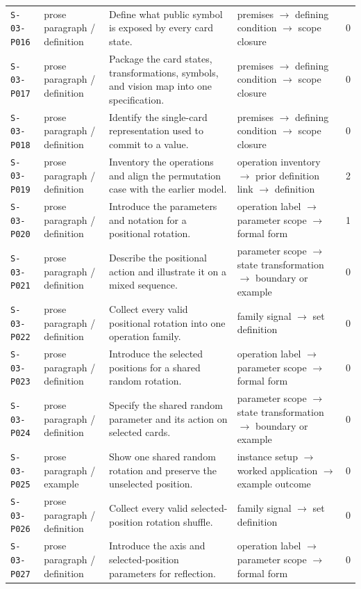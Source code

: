 \documentclass[10pt]{article}
\begin{document}
\begin{longtable}{@{}p{}p{}p{}p{}p{}@{}}
\texttt{S-03-P016}&prose paragraph / definition&Define what public symbol is exposed by every card state.&premises $\rightarrow$ defining condition $\rightarrow$ scope closure&0\\
\texttt{S-03-P017}&prose paragraph / definition&Package the card states, transformations, symbols, and vision map into one specification.&premises $\rightarrow$ defining condition $\rightarrow$ scope closure&0\\
\texttt{S-03-P018}&prose paragraph / definition&Identify the single-card representation used to commit to a value.&premises $\rightarrow$ defining condition $\rightarrow$ scope closure&0\\
\texttt{S-03-P019}&prose paragraph / definition&Inventory the operations and align the permutation case with the earlier model.&operation inventory $\rightarrow$ prior definition link $\rightarrow$ definition&2\\
\texttt{S-03-P020}&prose paragraph / definition&Introduce the parameters and notation for a positional rotation.&operation label $\rightarrow$ parameter scope $\rightarrow$ formal form&1\\
\texttt{S-03-P021}&prose paragraph / definition&Describe the positional action and illustrate it on a mixed sequence.&parameter scope $\rightarrow$ state transformation $\rightarrow$ boundary or example&0\\
\texttt{S-03-P022}&prose paragraph / definition&Collect every valid positional rotation into one operation family.&family signal $\rightarrow$ set definition&0\\
\texttt{S-03-P023}&prose paragraph / definition&Introduce the selected positions for a shared random rotation.&operation label $\rightarrow$ parameter scope $\rightarrow$ formal form&0\\
\texttt{S-03-P024}&prose paragraph / definition&Specify the shared random parameter and its action on selected cards.&parameter scope $\rightarrow$ state transformation $\rightarrow$ boundary or example&0\\
\texttt{S-03-P025}&prose paragraph / example&Show one shared random rotation and preserve the unselected position.&instance setup $\rightarrow$ worked application $\rightarrow$ example outcome&0\\
\texttt{S-03-P026}&prose paragraph / definition&Collect every valid selected-position rotation shuffle.&family signal $\rightarrow$ set definition&0\\
\texttt{S-03-P027}&prose paragraph / definition&Introduce the axis and selected-position parameters for reflection.&operation label $\rightarrow$ parameter scope $\rightarrow$ formal form&0\\

\end{longtable}
\end{document}
